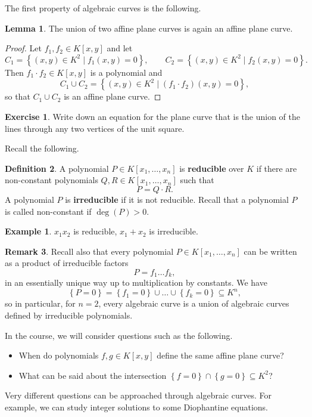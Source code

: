 \documentclass{article}
\newcommand{\rb}[1]{\left( #1 \right)}
\renewcommand{\sb}[1]{\left[ #1 \right]}
\newcommand{\cb}[1]{\left\{ #1 \right\}}
\theoremstyle{definition}\newtheorem{definition}{Definition}[section]
\theoremstyle{definition}\newtheorem{notation}[definition]{Notation}
\theoremstyle{definition}\newtheorem{remark}[definition]{Remark}
\theoremstyle{definition}\newtheorem{example1}[definition]{Example}
\theoremstyle{definition}\newtheorem{fact}{Fact}
\theoremstyle{definition}\newtheorem{exercise}{Exercise}
\theoremstyle{definition}\newtheorem*{example2}{Example}
\newtheorem{lemma}[definition]{Lemma}
\begin{document}
The first property of algebraic curves is the following.

\begin{lemma}
\label{lem:1.7}
The union of two affine plane curves is again an affine plane curve.
\end{lemma}

\begin{proof}
Let $ f_1, f_2 \in K\sb{x, y} $ and let
$$ C_1 = \cb{\rb{x, y} \in K^2 \mid f_1\rb{x, y} = 0}, \qquad C_2 = \cb{\rb{x, y} \in K^2 \mid f_2\rb{x, y} = 0}. $$
Then $ f_1 \cdot f_2 \in K\sb{x, y} $ is a polynomial and
$$ C_1 \cup C_2 = \cb{\rb{x, y} \in K^2 \mid \rb{f_1 \cdot f_2}\rb{x, y} = 0}, $$
so that $ C_1 \cup C_2 $ is an affine plane curve.
\end{proof}

\begin{exercise}
Write down an equation for the plane curve that is the union of the lines through any two vertices of the unit square.
\end{exercise}

Recall the following.

\begin{definition}
A polynomial $ P \in K\sb{x_1, \dots, x_n} $ is \textbf{reducible} over $ K $ if there are non-constant polynomials $ Q, R \in K\sb{x_1, \dots, x_n} $ such that
$$ P = Q \cdot R. $$
A polynomial $ P $ is \textbf{irreducible} if it is not reducible. Recall that a polynomial $ P $ is called non-constant if $ \deg\rb{P} > 0 $.
\end{definition}

\begin{example2}
$ x_1x_2 $ is reducible, $ x_1 + x_2 $ is irreducible.
\end{example2}

\begin{remark}
Recall also that every polynomial $ P \in K\sb{x_1, \dots, x_n} $ can be written as a product of irreducible factors
$$ P = f_1 \dots f_k, $$
in an essentially unique way up to multiplication by constants. We have
$$ \cb{P = 0} = \cb{f_1 = 0} \cup \dots \cup \cb{f_k = 0} \subseteq K^n, $$
so in particular, for $ n = 2 $, every algebraic curve is a union of algebraic curves defined by irreducible polynomials.
\end{remark}

In the course, we will consider questions such as the following.
\begin{itemize}
\item When do polynomials $ f, g \in K\sb{x, y} $ define the same affine plane curve?
\item What can be said about the intersection $ \cb{f = 0} \cap \cb{g = 0} \subseteq K^2 $?
\end{itemize}
Very different questions can be approached through algebraic curves. For example, we can study integer solutions to some Diophantine equations.
\end{document}
